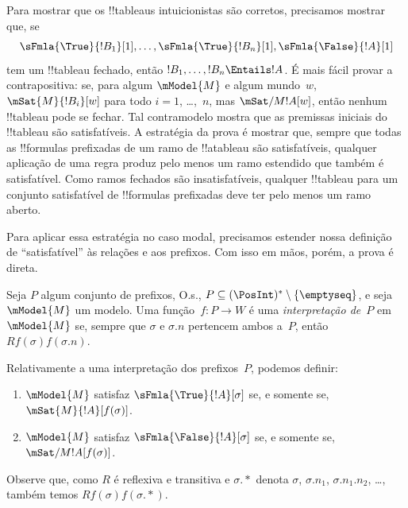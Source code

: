 \documentclass[../../../include/open-logic-section]{subfiles}
\begin{document}


\begin{explain}
  Para mostrar que os !!{tableau}s intuicionistas são corretos, precisamos
  mostrar que, se
  \[
  \sFmla{\True}{!B_1}[1], \dots, \sFmla{\True}{!B_n}[1], \sFmla{\False}{!A}[1]
  \]
  tem um !!{tableau} fechado, então $!B_1, \dots, !B_n \Entails !A$. É
  mais fácil provar a contrapositiva: se, para algum $\mModel{M}$ e algum
  mundo~$w$, $\mSat{M}{!B_i}[w]$ para todo $i=1$, \dots,~$n$, mas
  $\mSat/{M}{!A}[w]$, então nenhum !!{tableau} pode se fechar. Tal
  contramodelo mostra que as premissas iniciais do !!{tableau}
  são satisfatíveis. A estratégia da prova é mostrar que, sempre que
  todas as !!{formula}s prefixadas de um ramo de !!a{tableau} são
  satisfatíveis, qualquer aplicação de uma regra produz pelo menos um
  ramo estendido que também é satisfatível. Como ramos fechados são
  insatisfatíveis, qualquer !!{tableau} para um conjunto satisfatível de
  !!{formula}s prefixadas deve ter pelo menos um ramo aberto.

  Para aplicar essa estratégia no caso modal, precisamos estender
  nossa definição de ``satisfatível'' às relações e aos prefixos. Com
  isso em mãos, porém, a prova é direta.
\end{explain}

\begin{defn}
  Seja $P$ algum conjunto de prefixos, O.s.\@, $P \subseteq (\PosInt)^*
  \setminus \{\emptyseq\}$, e seja $\mModel{M}$ um modelo. Uma
  função~$f\colon P \to W$ é uma \emph{interpretação de}~$P$
  em~$\mModel{M}$ se, sempre que $\sigma$ e $\sigma.n$ pertencem ambos
  a~$P$, então $Rf(\sigma)f(\sigma.n)$.

  Relativamente a uma interpretação dos prefixos~$P$, podemos definir:
  \begin{enumerate}
  \item $\mModel{M}$ satisfaz $\sFmla{\True}{!A}[\sigma]$ se, e somente se,
    $\mSat{M}{!A}[f(\sigma)]$.
  \item $\mModel{M}$ satisfaz $\sFmla{\False}{!A}[\sigma]$ se, e somente se,
    $\mSat/{M}{!A}[f(\sigma)]$.
  \end{enumerate}
\end{defn}

Observe que, como $R$ é reflexiva e transitiva e $\sigma.{*}$
denota $\sigma$, $\sigma.n_1$, $\sigma.n_1.n_2$, \dots, também temos
$Rf(\sigma)f(\sigma.{*})$. 
\end{document}
